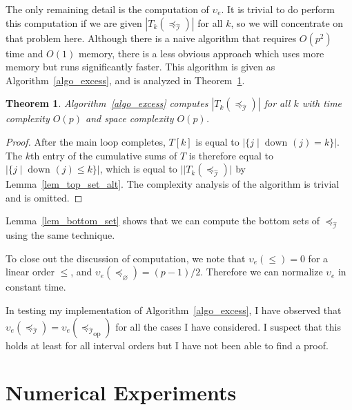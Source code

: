 \documentclass[12pt]{article}
\newcommand{\dual}[1]{#1_{\operatorname{op}}}
\newcommand{\dset}[2][]{\operatorname{down}_{#1}(#2)}
\newcommand{\eord}{{\preceq_{\varnothing}}}
\newcommand{\iord}{{\preceq_{\hat{\mathcal{I}}}}}
\newtheorem{theorem}{Theorem}
\numberwithin{theorem}{section}
\begin{document}
The only remaining detail is the computation of $\upsilon_e$.  It is trivial to do perform this computation if we are given $|T_k(\iord)|$ for all $k$, so we will concentrate on that problem here.  Although there is a naive algorithm that requires $O(p^2)$ time and $O(1)$ memory, there is a less obvious approach which uses more memory but runs significantly faster.  This algorithm is given as Algorithm~\ref{algo_excess}, and is analyzed in Theorem~\ref{thm_algo_excess}.

\begin{theorem}
\label{thm_algo_excess}
Algorithm~\ref{algo_excess} computes $|T_k(\iord)|$ for all $k$ with time complexity $O(p)$ and space complexity $O(p)$.
\end{theorem}
\begin{proof}
After the main loop completes, $T[k]$ is equal to $|\{j \mid \dset{j} = k\}|$.  The $k$th entry of the cumulative sums of $T$ is therefore equal to $|\{j \mid \dset{j} \leq k\}|$, which is equal to $||T_k(\iord)|$ by Lemma~\ref{lem_top_set_alt}.  The complexity analysis of the algorithm is trivial and is omitted.
\end{proof}

\noindent
Lemma~\ref{lem_bottom_set} shows that we can compute the bottom sets of $\iord$ using the same technique.

To close out the discussion of computation, we note that $\upsilon_e(\leqslant) = 0$ for a linear order $\leqslant$, and $\upsilon_e(\eord) = (p - 1) / 2$.  Therefore we can normalize $\upsilon_e$ in constant time.

In testing my implementation of Algorithm~\ref{algo_excess}, I have observed that $\upsilon_e(\iord) = \upsilon_e(\dual{\iord})$ for all the cases I have considered.  I suspect that this holds at least for all interval orders but I have not been able to find a proof.

\section{Numerical Experiments}
\label{sec_sim}
\end{document}
